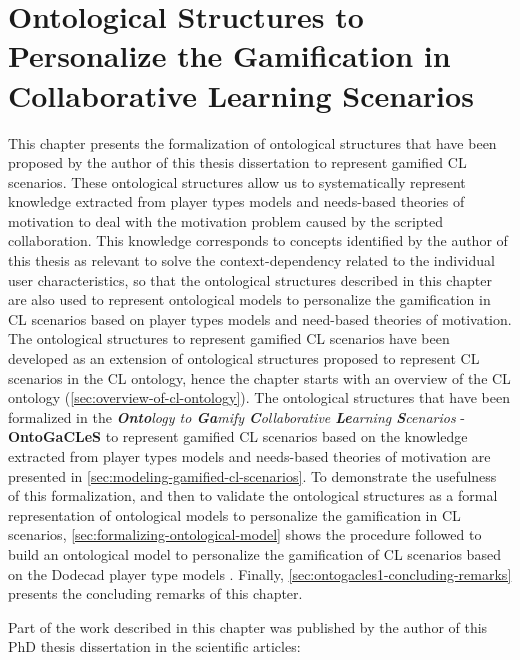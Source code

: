 \chapter[Ontological Structures to Personalize the Gamification in CL Scenarios]{Ontological Structures to Personalize the Gamification in Collaborative Learning Scenarios}
\label{chapter:ontogacles-1}

This chapter presents the formalization of ontological structures that have been proposed by the author of this thesis dissertation to represent gamified CL scenarios. These ontological structures allow us to systematically represent knowledge extracted from player types models and needs-based theories of motivation to deal with the motivation problem caused by the scripted collaboration. This knowledge corresponds to concepts identified by the author of this thesis as relevant to solve the context-dependency related to the individual user characteristics, so that the ontological structures described in this chapter are also used to represent ontological models to personalize the gamification in CL scenarios based on player types models and need-based theories of motivation. The ontological structures to represent gamified CL scenarios have been developed as an extension of ontological structures proposed to represent CL scenarios in the CL ontology, hence the chapter starts with an overview of the CL ontology (\autoref{sec:overview-of-cl-ontology}). The ontological structures that have been formalized in the \emph{\textbf{Onto}logy to \textbf{Ga}mify \textbf{C}ollaborative \textbf{Le}arning \textbf{S}cenarios} - \textbf{OntoGaCLeS} to represent gamified CL scenarios based on the knowledge extracted from player types models and needs-based theories of motivation are presented in \autoref{sec:modeling-gamified-cl-scenarios}. To demonstrate the usefulness of this formalization, and then to validate the ontological structures as a formal representation of ontological models to personalize the gamification in CL scenarios, \autoref{sec:formalizing-ontological-model} shows the procedure followed to build an ontological model to personalize the gamification of CL scenarios based on the Dodecad player type models \cite{Marczewski2015b}. Finally, \autoref{sec:ontogacles1-concluding-remarks} presents the concluding remarks of this chapter.

Part of the work described in this chapter was published by the author of this PhD thesis dissertation in the scientific articles:

